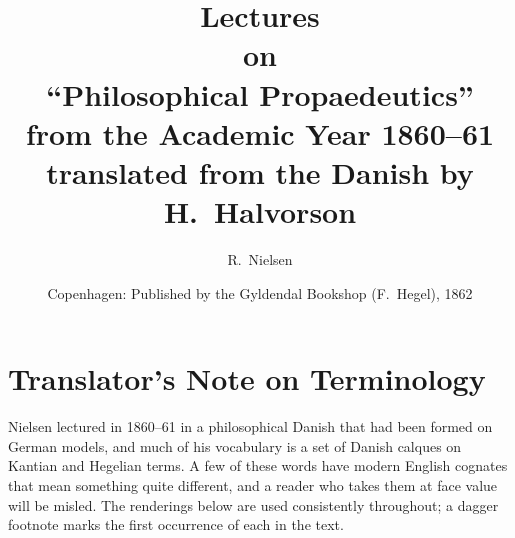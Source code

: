 \documentclass[12pt,a4paper]{book}
\title{\textbf{Lectures}\\[4pt]
  \large on\\[4pt]
  \textbf{\large ``Philosophical Propaedeutics''}\\[6pt]
  \large from the Academic Year 1860--61\\[10pt]
  \normalsize translated from the Danish by H.\ Halvorson}
\author{R.\ Nielsen}
\date{Copenhagen: Published by the Gyldendal Bookshop (F.\ Hegel), 1862}
\begin{document}
\maketitle
\thispagestyle{empty}
\newpage

\tableofcontents
\newpage

\chapter*{Translator's Note on Terminology}
\label{ch:tnote}

Nielsen lectured in 1860--61 in a philosophical Danish that had been formed on
German models, and much of his vocabulary is a set of Danish calques on Kantian
and Hegelian terms. A few of these words have modern English cognates that mean
something quite different, and a reader who takes them at face value will be
misled. The renderings below are used consistently throughout; a dagger
footnote marks the first occurrence of each in the text.
\end{document}
